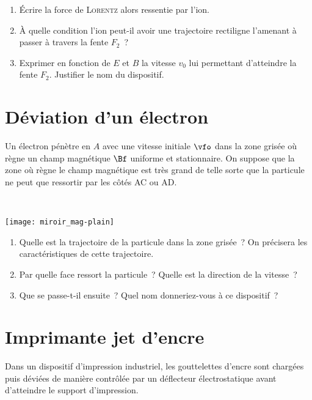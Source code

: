 \documentclass[a4paper, 12pt, final, garamond]{book}
\begin{document}
\begin{enumerate}
    \item Écrire la force de \textsc{Lorentz} alors ressentie par l'ion.
    \item À quelle condition l'ion peut-il avoir une trajectoire rectiligne
        l'amenant à passer à travers la fente $F_2$~?
    \item Exprimer en fonction de $E$ et $B$ la vitesse $v_0$ lui permettant
        d'atteindre la fente $F_2$. Justifier le nom du dispositif.
\end{enumerate}

\section{Déviation d'un électron}

\begin{minipage}[c]{0.50\linewidth}
    Un électron pénètre en $A$ avec une vitesse initiale $\vfo$ dans la zone
    grisée où règne un champ magnétique $\Bf$ uniforme et stationnaire. On
    suppose que la zone où règne le champ magnétique est très grand de telle
    sorte que la particule ne peut que ressortir par les côtés AC ou AD. 
\end{minipage}
\hfill
\begin{minipage}[c]{0.50\linewidth}
    ~
    \begin{center}
        \texttt{[image: miroir\_mag-plain]}
        \label{fig:mirmag}
    \end{center}
\end{minipage}

\begin{enumerate}
    \item Quelle est la trajectoire de la particule dans la zone grisée~? On
        précisera les caractéristiques de cette trajectoire.
    \item Par quelle face ressort la particule~? Quelle est la direction de la
        vitesse~?
    \item Que se passe-t-il ensuite~? Quel nom donneriez-vous à ce dispositif~?
\end{enumerate}

\section{Imprimante jet d'encre}

Dans un dispositif d'impression industriel, les gouttelettes d'encre sont
chargées puis déviées de manière contrôlée par un déflecteur électrostatique
avant d'atteindre le support d'impression. \bigbreak
\end{document}
